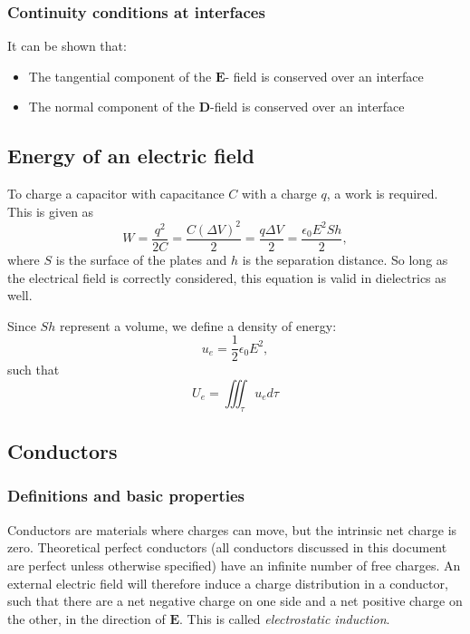 \documentclass[a4paper, 12pt]{article}
\renewcommand{\vec}[1]{\mathbf{#1}}
\newcommand{\E}{\ensuremath{\vec{E}}}
\newcommand{\e}{\ensuremath{\epsilon_0}}
\newcommand{\D}{\ensuremath{\vec{D}}}
\begin{document}
    \subsubsection{Continuity conditions at interfaces}
        It can be shown that:
        \begin{itemize}
            \item The tangential component of the $\E$- field is conserved over an interface
            \item The normal component of the $\D$-field is conserved over an interface
        \end{itemize}

\subsection{Energy of an electric field}
    To charge a capacitor with capacitance $C$ with a charge $q$, a work is required. This is given as 
    \begin{equation}
        W = \frac{q^2}{2C} = \frac{C(\Delta V)^2}{2} = \frac{q\Delta V}{2} = \frac{\e E^2S h}{2},
    \end{equation}
    where $S$ is the surface of the plates and $h$ is the separation distance. 
    So long as the electrical field is correctly considered, this equation is valid in dielectrics as well.
    
    Since $S h$ represent a volume, we define a density of energy: 
    \begin{equation}
        u_e = \frac{1}{2}\e E^2, 
    \end{equation}
    such that 
    \begin{equation}
        U_e = \iiint_\tau u_e d\tau
    \end{equation}
    
\subsection{Conductors}
    \subsubsection{Definitions and basic properties}
        Conductors are materials where charges can move, but the intrinsic net charge is zero. 
        Theoretical perfect conductors (all conductors discussed in this document are perfect unless otherwise specified) 
        have an infinite number of free charges. 
        An external electric field will therefore induce a charge distribution in a conductor, 
        such that there are a net negative charge on one side and a net positive charge on the other, 
        in the direction of $\E$. This is called \textit{electrostatic induction}.
        
\end{document}
